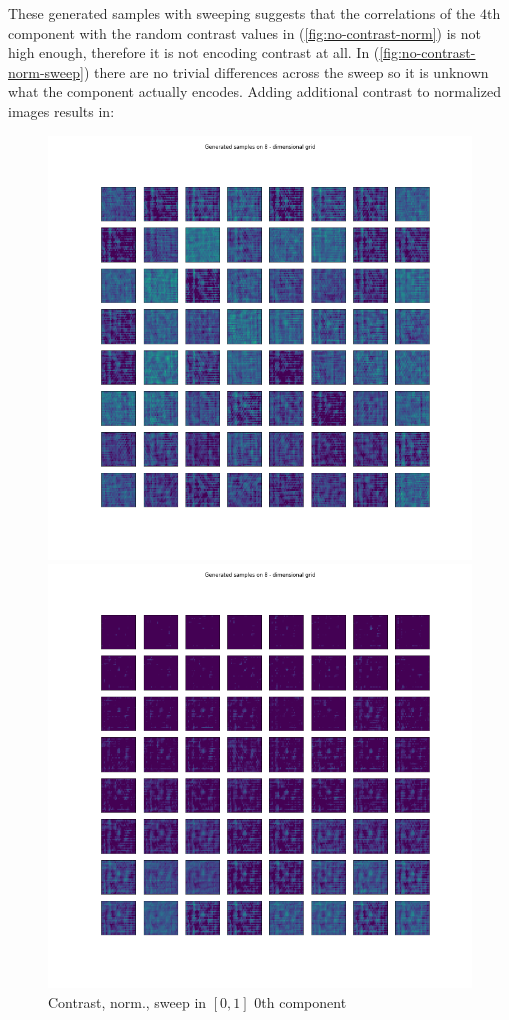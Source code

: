 \documentclass[12pt, english]{article}
\begin{document}
\par  These generated samples with sweeping suggests that the correlations of the $4$th component with the random contrast values in (\ref{fig:no-contrast-norm}) is not high enough, therefore it is not encoding contrast at all. In (\ref{fig:no-contrast-norm-sweep}) there are no trivial differences across the sweep so it is unknown what the component actually encodes. Adding additional contrast to normalized images results in:

\vspace{4mm}
 
\begin{figure}[H]
  \begin{minipage}[b]{0.5\linewidth}
    \centering
    \includegraphics[width=.85\linewidth]{sweep/norm_contrast_sweep_zero_to_one_0th_param.png} 
    \caption{Contrast, norm., sweep in $[0, 1]$ \newline $0$th component} 
    \label{fig:contrast-norm-sweep-0}
  \end{minipage} 
  \begin{minipage}[b]{0.5\linewidth}
    \centering
    \includegraphics[width=.85\linewidth]{sweep/norm_contrast_sweep_minus_two_to_one_2nd_param.png} 

\end{minipage}
\end{figure}
\end{document}
